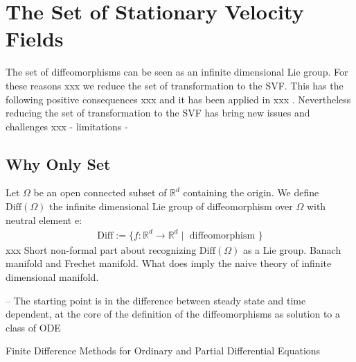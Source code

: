 

\section{The Set of Stationary Velocity Fields}\label{ch:svf}


The set of diffeomorphisms can be seen as an infinite dimensional Lie group. For these reasons xxx we reduce the set of transformation to the SVF. This has the following positive consequences xxx and it has been applied in xxx . Nevertheless reducing the set of transformation to the SVF has bring new issues and challenges xxx - limitations - 

\subsection{Why Only Set}\label{se:svf_set}
Let $\Omega$ be an open connected subset of $\mathbb{R}^d$ containing the origin.  We define $\text{Diff}(\Omega)$ the infinite dimensional Lie group of diffeomorphism over $\Omega$ with neutral element $\text{e}$:
\begin{align*}
\text{Diff}:= \lbrace f:\mathbb{R}^d \longrightarrow \mathbb{R}^d \mid \text{ diffeomorphism } \rbrace
\end{align*}
xxx Short non-formal part about recognizing $\text{Diff}(\Omega)$ as a Lie group. Banach manifold and Frechet manifold. What does imply the naive theory of infinite dimensional manifold.

-- The starting point is in the difference between steady state and time dependent, at the core of the definition of the diffeomorphisms as solution to a class of ODE

Finite Difference Methods for Ordinary and Partial Differential Equations

